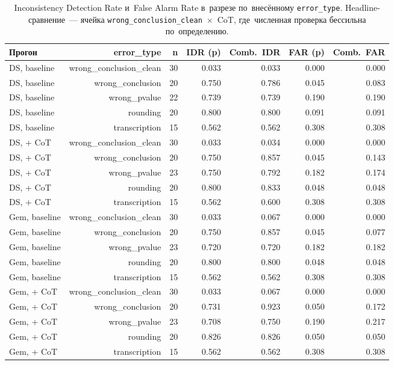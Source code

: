 \begin{table}[h]
\centering
\small
\caption{Inconsistency Detection Rate и~False Alarm Rate в~разрезе по~внесённому \texttt{error\_type}. Headline-сравнение~--- ячейка \texttt{wrong\_conclusion\_clean}~$\times$~CoT, где~численная проверка бессильна по~определению.}
\label{tab:exp_idr_by_error}
\begin{tabular}{@{}lrrrrrr@{}}
\toprule
Прогон & error\_type & n & IDR (p) & Comb.~IDR & FAR (p) & Comb.~FAR \\
\midrule
DS, baseline & wrong_conclusion_clean & 30 & 0.033 & 0.033 & 0.000 & 0.000 \\
DS, baseline & wrong_conclusion & 20 & 0.750 & 0.786 & 0.045 & 0.083 \\
DS, baseline & wrong_pvalue & 22 & 0.739 & 0.739 & 0.190 & 0.190 \\
DS, baseline & rounding & 20 & 0.800 & 0.800 & 0.091 & 0.091 \\
DS, baseline & transcription & 15 & 0.562 & 0.562 & 0.308 & 0.308 \\
DS, + CoT & wrong_conclusion_clean & 30 & 0.033 & 0.034 & 0.000 & 0.000 \\
DS, + CoT & wrong_conclusion & 20 & 0.750 & 0.857 & 0.045 & 0.143 \\
DS, + CoT & wrong_pvalue & 23 & 0.750 & 0.792 & 0.182 & 0.174 \\
DS, + CoT & rounding & 20 & 0.800 & 0.833 & 0.048 & 0.048 \\
DS, + CoT & transcription & 15 & 0.562 & 0.600 & 0.308 & 0.308 \\
Gem, baseline & wrong_conclusion_clean & 30 & 0.033 & 0.067 & 0.000 & 0.000 \\
Gem, baseline & wrong_conclusion & 20 & 0.750 & 0.857 & 0.045 & 0.077 \\
Gem, baseline & wrong_pvalue & 23 & 0.720 & 0.720 & 0.182 & 0.182 \\
Gem, baseline & rounding & 20 & 0.800 & 0.800 & 0.048 & 0.048 \\
Gem, baseline & transcription & 15 & 0.562 & 0.562 & 0.308 & 0.308 \\
Gem, + CoT & wrong_conclusion_clean & 30 & 0.033 & 0.067 & 0.000 & 0.000 \\
Gem, + CoT & wrong_conclusion & 20 & 0.731 & 0.923 & 0.050 & 0.172 \\
Gem, + CoT & wrong_pvalue & 23 & 0.708 & 0.750 & 0.190 & 0.217 \\
Gem, + CoT & rounding & 20 & 0.826 & 0.826 & 0.050 & 0.050 \\
Gem, + CoT & transcription & 15 & 0.562 & 0.562 & 0.308 & 0.308 \\
\bottomrule
\end{tabular}
\end{table}
